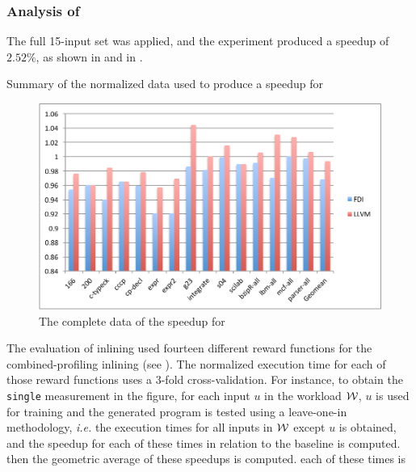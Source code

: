 
\subsubsection{Analysis of \gcc}


The full 15-input set was applied, and the experiment produced a speedup of $2.52 \%$, as shown in  and in .

\begin{table}
  \centering
  \begin{tiny}
  
  \end{tiny}
  \caption{Summary of the normalized data used to produce a speedup for \gcc}
  \label{tab:fullspeedup}
\end{table}

\begin{figure}
  \centering
  \includegraphics[width=1.00\linewidth]{Figures/speedupgccall}
  \caption{The complete data of the speedup for \gcc}
  \label{fig:gccall}
\end{figure}

The evaluation of inlining used fourteen different reward functions for the combined-profiling inlining (see ). The normalized execution time for each of those reward functions uses a 3-fold cross-validation. For instance, to obtain the {\tt single} measurement in the figure, for each input $u$ in the workload $\cal{W}$, $u$ is used for training and the generated program is tested using a leave-one-in methodology, {\em i.e.} the execution times for all inputs in $\cal{W}$ except $u$ is obtained, and the speedup for each of these times in relation to the baseline is computed. then the geometric average of these speedups is computed. each of these times is

